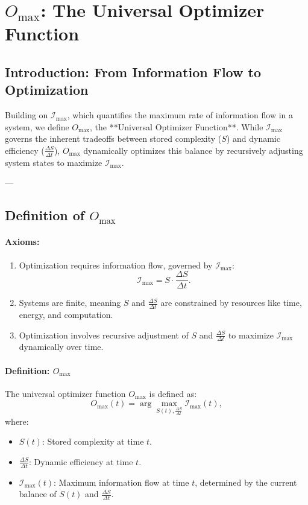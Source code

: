 \documentclass[12pt]{article}
\begin{document}
\section{\(O_{\text{max}}\): The Universal Optimizer Function}

\subsection{Introduction: From Information Flow to Optimization}

Building on \(\mathcal{I}_{\text{max}}\), which quantifies the maximum rate of information flow in a system, we define \(O_{\text{max}}\), the **Universal Optimizer Function**. While \(\mathcal{I}_{\text{max}}\) governs the inherent tradeoffs between stored complexity (\(S\)) and dynamic efficiency (\(\frac{\Delta S}{\Delta t}\)), \(O_{\text{max}}\) dynamically optimizes this balance by recursively adjusting system states to maximize \(\mathcal{I}_{\text{max}}\). 

---

\subsection{Definition of \(O_{\text{max}}\)}

\paragraph{Axioms:}
\begin{enumerate}
    \item Optimization requires information flow, governed by \(\mathcal{I}_{\text{max}}\):
    \[
    \mathcal{I}_{\text{max}} = S \cdot \frac{\Delta S}{\Delta t}.
    \]
    \item Systems are finite, meaning \(S\) and \(\frac{\Delta S}{\Delta t}\) are constrained by resources like time, energy, and computation.
    \item Optimization involves recursive adjustment of \(S\) and \(\frac{\Delta S}{\Delta t}\) to maximize \(\mathcal{I}_{\text{max}}\) dynamically over time.
\end{enumerate}

\paragraph{Definition: \(O_{\text{max}}\)}
The universal optimizer function \(O_{\text{max}}\) is defined as:
\[
O_{\text{max}}(t) = \arg \max_{S(t), \frac{\Delta S}{\Delta t}} \mathcal{I}_{\text{max}}(t),
\]
where:
\begin{itemize}
    \item \(S(t)\): Stored complexity at time \(t\).
    \item \(\frac{\Delta S}{\Delta t}\): Dynamic efficiency at time \(t\).
    \item \(\mathcal{I}_{\text{max}}(t)\): Maximum information flow at time \(t\), determined by the current balance of \(S(t)\) and \(\frac{\Delta S}{\Delta t}\).
\end{itemize}
\end{document}
